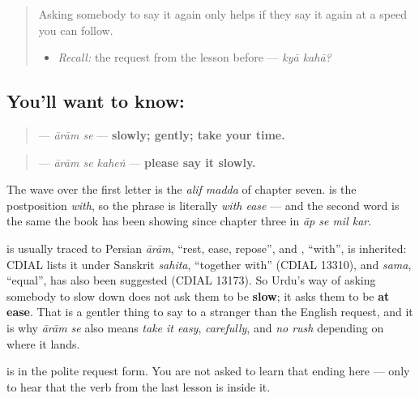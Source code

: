 \label{lesson:UR-C22-aram-se}



\begin{quote}
Asking somebody to say it again only helps if they say it again at a speed you can follow.

\begin{itemize}
\raggedright
  \item \emph{Recall:} the request from the lesson before — \emph{kyā kahā?}
\end{itemize}
\end{quote}

\subsection*{You'll want to know:  }
\begin{quote}
\textbf{ } — \emph{ārām se} — \textbf{slowly; gently; take your time.}
\end{quote}

\begin{quote}
\textbf{  } — \emph{ārām se kaheṅ} — \textbf{please say it slowly.}
\end{quote}

The wave over the first letter is the \emph{alif madda} of chapter seven. \textbf{} is the postposition \emph{with}, so the phrase is literally \emph{with ease} — and the second word is the same \textbf{} the book has been showing since chapter three in \emph{āp se mil kar}.

\begin{cousinweb}
\textbf{} is usually traced to Persian \emph{ārām}, \textquotedblleft{}rest, ease, repose\textquotedblright{}, and \textbf{}, \textquotedblleft{}with\textquotedblright{}, is inherited: CDIAL lists it under Sanskrit \emph{sahita}, \textquotedblleft{}together with\textquotedblright{} (CDIAL 13310), and \emph{sama}, \textquotedblleft{}equal\textquotedblright{}, has also been suggested (CDIAL 13173). So Urdu's way of asking somebody to slow down does not ask them to be \textbf{slow}; it asks them to be \textbf{at ease}. That is a gentler thing to say to a stranger than the English request, and it is why \emph{ārām se} also means \emph{take it easy}, \emph{carefully}, and \emph{no rush} depending on where it lands.

\textbf{} is \textbf{} in the polite request form. You are not asked to learn that ending here — only to hear that the verb from the last lesson is inside it.
\end{cousinweb}

